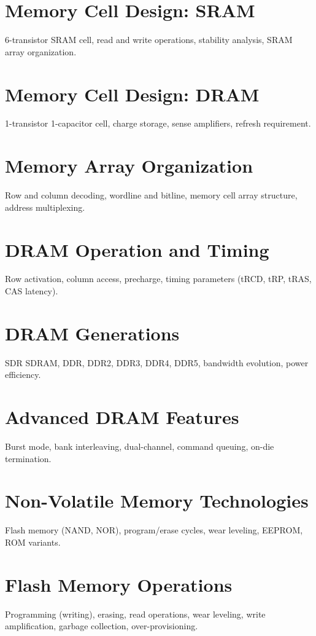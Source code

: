 
\chapter{Memory Cell Design: SRAM}
6-transistor SRAM cell, read and write operations, stability analysis, SRAM array organization.

\chapter{Memory Cell Design: DRAM}
1-transistor 1-capacitor cell, charge storage, sense amplifiers, refresh requirement.

\chapter{Memory Array Organization}
Row and column decoding, wordline and bitline, memory cell array structure, address multiplexing.

\chapter{DRAM Operation and Timing}
Row activation, column access, precharge, timing parameters (tRCD, tRP, tRAS, CAS latency).

\chapter{DRAM Generations}
SDR SDRAM, DDR, DDR2, DDR3, DDR4, DDR5, bandwidth evolution, power efficiency.

\chapter{Advanced DRAM Features}
Burst mode, bank interleaving, dual-channel, command queuing, on-die termination.

\chapter{Non-Volatile Memory Technologies}
Flash memory (NAND, NOR), program/erase cycles, wear leveling, EEPROM, ROM variants.

\chapter{Flash Memory Operations}
Programming (writing), erasing, read operations, wear leveling, write amplification, garbage collection, over-provisioning.

